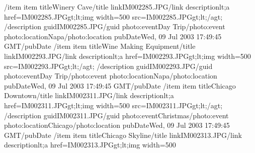 \documentclass[letterpaper,12pt,english,openany,oneside]{sphinxmanual}
\begin{document}
\begin{sphinxVerbatim}[commandchars=\\\{\}]
       \PYGZlt{}/item\PYGZgt{}
       \PYGZlt{}item\PYGZgt{}
           \PYGZlt{}title\PYGZgt{}Winery Cave\PYGZlt{}/title\PYGZgt{}
           \PYGZlt{}link\PYGZgt{}IM002285.JPG\PYGZlt{}/link\PYGZgt{}
           \PYGZlt{}description\PYGZgt{}\PYGZam{}lt;a href=\PYGZdq{}IM002285.JPG\PYGZdq{}\PYGZam{}gt;\PYGZam{}lt;img width=500
               src=\PYGZdq{}IM002285.JPG\PYGZdq{}\PYGZam{}gt;\PYGZam{}lt;/a\PYGZam{}gt;
           \PYGZlt{}/description\PYGZgt{}
           \PYGZlt{}guid\PYGZgt{}IM002285.JPG\PYGZlt{}/guid\PYGZgt{}
           \PYGZlt{}photo:event\PYGZgt{}Day Trip\PYGZlt{}/photo:event\PYGZgt{}
           \PYGZlt{}photo:location\PYGZgt{}Napa\PYGZlt{}/photo:location\PYGZgt{}
           \PYGZlt{}pubDate\PYGZgt{}Wed, 09 Jul 2003 17:49:45 GMT\PYGZlt{}/pubDate\PYGZgt{}
       \PYGZlt{}/item\PYGZgt{}
       \PYGZlt{}item\PYGZgt{}
           \PYGZlt{}title\PYGZgt{}Wine Making Equipment\PYGZlt{}/title\PYGZgt{}
           \PYGZlt{}link\PYGZgt{}IM002293.JPG\PYGZlt{}/link\PYGZgt{}
           \PYGZlt{}description\PYGZgt{}\PYGZam{}lt;a href=\PYGZdq{}IM002293.JPG\PYGZdq{}\PYGZam{}gt;\PYGZam{}lt;img width=500
               src=\PYGZdq{}IM002293.JPG\PYGZdq{}\PYGZam{}gt;\PYGZam{}lt;/a\PYGZam{}gt;
           \PYGZlt{}/description\PYGZgt{}
           \PYGZlt{}guid\PYGZgt{}IM002293.JPG\PYGZlt{}/guid\PYGZgt{}
           \PYGZlt{}photo:event\PYGZgt{}Day Trip\PYGZlt{}/photo:event\PYGZgt{}
           \PYGZlt{}photo:location\PYGZgt{}Napa\PYGZlt{}/photo:location\PYGZgt{}
           \PYGZlt{}pubDate\PYGZgt{}Wed, 09 Jul 2003 17:49:45 GMT\PYGZlt{}/pubDate\PYGZgt{}
       \PYGZlt{}/item\PYGZgt{}
       \PYGZlt{}item\PYGZgt{}
           \PYGZlt{}title\PYGZgt{}Chicago Downtown\PYGZlt{}/title\PYGZgt{}
           \PYGZlt{}link\PYGZgt{}IM002311.JPG\PYGZlt{}/link\PYGZgt{}
           \PYGZlt{}description\PYGZgt{}\PYGZam{}lt;a href=\PYGZdq{}IM002311.JPG\PYGZdq{}\PYGZam{}gt;\PYGZam{}lt;img width=500
               src=\PYGZdq{}IM002311.JPG\PYGZdq{}\PYGZam{}gt;\PYGZam{}lt;/a\PYGZam{}gt;
           \PYGZlt{}/description\PYGZgt{}
           \PYGZlt{}guid\PYGZgt{}IM002311.JPG\PYGZlt{}/guid\PYGZgt{}
           \PYGZlt{}photo:event\PYGZgt{}Christmas\PYGZlt{}/photo:event\PYGZgt{}
           \PYGZlt{}photo:location\PYGZgt{}Chicago\PYGZlt{}/photo:location\PYGZgt{}
           \PYGZlt{}pubDate\PYGZgt{}Wed, 09 Jul 2003 17:49:45 GMT\PYGZlt{}/pubDate\PYGZgt{}
       \PYGZlt{}/item\PYGZgt{}
       \PYGZlt{}item\PYGZgt{}
           \PYGZlt{}title\PYGZgt{}Chicago Skyline\PYGZlt{}/title\PYGZgt{}
           \PYGZlt{}link\PYGZgt{}IM002313.JPG\PYGZlt{}/link\PYGZgt{}
           \PYGZlt{}description\PYGZgt{}\PYGZam{}lt;a href=\PYGZdq{}IM002313.JPG\PYGZdq{}\PYGZam{}gt;\PYGZam{}lt;img width=500

\end{sphinxVerbatim}
\end{document}
